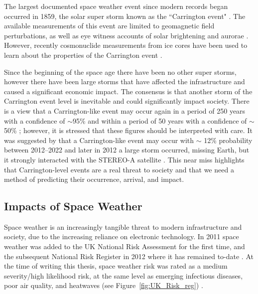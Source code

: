 The largest documented space weather event since modern records began occurred in 1859, the solar super storm known as the ``Carrington event" \citep{carrington_description_1859}. The available measurements of this event are limited to geomagnetic field perturbations, as well as eye witness accounts of solar brightening and aurorae \citep{cannon_extreme_2013}. However, recently cosmonuclide measurements from ice cores have been used to learn about the properties of the Carrington event \citep{riley_probability_2012}.%

Since the beginning of the space age there have been no other super storms, however there have been large storms that have affected the infrastructure and caused a significant economic impact. The consensus is that another storm of the Carrington event level is inevitable and could significantly impact society. There is a view that a Carrington-like event may occur again in a period of 250 years with a confidence of $\sim$95\% and within a period of 50 years with a confidence of $\sim$50\% \citep{cannon_extreme_2013}; however, it is stressed that these figures should be interpreted with care. It was suggested by \cite{riley_probability_2012} that a Carrington-like event may occur with $\sim$ 12\% probability between 2012--2022 and later in 2012 a large storm occurred, missing Earth, but it strongly interacted with the STEREO-A satellite \citep{russell_very_2013}. This near miss highlights that Carrington-level events are a real threat to society and that we need a method of predicting their occurrence, arrival, and impact.



\subsection{Impacts of Space Weather}
\label{sw_impacts}
Space weather is an increasingly tangible threat to modern infrastructure and society, due to the increasing reliance on electronic technology. In 2011 space weather was added to the UK National Risk Assessment for the first time, and the subsequent National Risk Register in 2012 \citep{bis_space_2015} where it has remained to-date \citep{hm_government_national_2020}. At the time of writing this thesis, space weather risk was rated as a medium severity/high likelihood risk, at the same level as emerging infectious diseases, poor air quality, and heatwaves (see Figure~\ref{fig:UK_Risk_reg}) \citep{cabinet_office_national_2017}.


